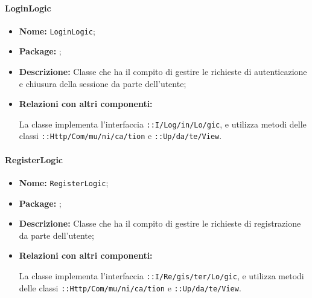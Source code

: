 \paragraph{LoginLogic}
\begin{flushleft}
\begin{itemize}
\item \textbf{Nome:} \texttt{LoginLogic};
\item \textbf{Package:} \texttt{\logicUser{}};
\item \textbf{Descrizione:} Classe che ha il compito di gestire le richieste di autenticazione e chiusura della sessione da parte dell'utente;
\item \textbf{Relazioni con altri componenti:}
\begin{sloppypar}
La classe implementa l'interfaccia \texttt{\iLogicUser{}::I\fshyp{}Log\fshyp{}in\fshyp{}Lo\fshyp{}gic}, e utilizza metodi delle classi \texttt{\serverCommunication{}::Http\fshyp{}Com\fshyp{}mu\fshyp{}ni\fshyp{}ca\fshyp{}tion} e \texttt{\viewUser{}::Up\fshyp{}da\fshyp{}te\fshyp{}View}.
\end{sloppypar}
\end{itemize}
\end{flushleft}

\paragraph{RegisterLogic}
\begin{flushleft}
\begin{itemize}
\item \textbf{Nome:} \texttt{RegisterLogic};
\item \textbf{Package:} \texttt{\logicUser{}};
\item \textbf{Descrizione:} Classe che ha il compito di gestire le richieste di registrazione da parte dell'utente;
\item \textbf{Relazioni con altri componenti:}
\begin{sloppypar}
La classe implementa l'interfaccia \texttt{\iLogicUser{}::I\fshyp{}Re\fshyp{}gis\fshyp{}ter\fshyp{}Lo\fshyp{}gic}, e utilizza metodi delle classi \texttt{\serverCommunication{}::Http\fshyp{}Com\fshyp{}mu\fshyp{}ni\fshyp{}ca\fshyp{}tion} e \texttt{\viewUser{}::Up\fshyp{}da\fshyp{}te\fshyp{}View}.
\end{sloppypar}
\end{itemize}
\end{flushleft}

